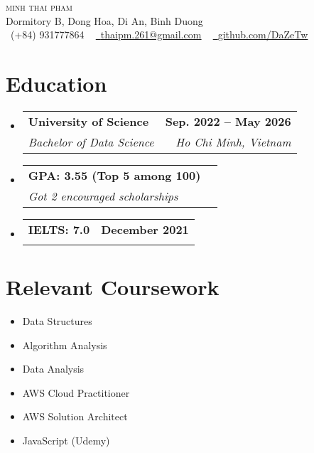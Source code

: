 \documentclass[letterpaper,11pt]{article}
\makeatletter
\newcommand{\resumeSubheading}[4]{
  \vspace{-2pt}\item
    \begin{tabular*}{1.0\textwidth}[t]{l@{\extracolsep{\fill}}r}
      \textbf{#1} & \textbf{\small #2} \\
      \textit{\small#3} & \textit{\small #4} \\
    \end{tabular*}\vspace{-7pt}
}
\newcommand{\resumeSubHeadingListStart}{\begin{itemize}[leftmargin=0.0in, label={}]}
\newcommand{\resumeSubHeadingListEnd}{\end{itemize}}
\makeatother
\begin{document}

\begin{center}
    {\Huge \scshape minh thai pham} \\ \vspace{1pt}
    Dormitory B, Dong Hoa, Di An, Binh Duong \\ \vspace{1pt}
    \small \raisebox{-0.1\height}\faPhone\ (+84) 931777864 ~ \href{mailto:thaipm.261@gmail.com}{\raisebox{-0.2\height}\faEnvelope\  \underline{thaipm.261@gmail.com}} ~ 
    \href{https://github.com/DaZeTw}{\raisebox{-0.2\height}\faGithub\ \underline{github.com/DaZeTw}}
    \vspace{-8pt}
\end{center}


\section{Education}
  \resumeSubHeadingListStart
    \resumeSubheading
      {University of Science}{Sep. 2022 -- May 2026}
      {Bachelor of Data Science}{Ho Chi Minh, Vietnam}
    \resumeSubheading
      {GPA: 3.55 (Top 5 among 100)}{}
      {Got 2 encouraged scholarships}{}
 \resumeSubheading
      {IELTS: 7.0}{December 2021}
      {}{}
      \vspace{-18pt}
  \resumeSubHeadingListEnd

\section{Relevant Coursework}
        \begin{multicols}{4}
            \begin{itemize}[itemsep=-5pt, parsep=3pt]
                \item\small Data Structures
                \item Algorithm Analysis
                \item Data Analysis
                \item AWS Cloud Practitioner 
                \item AWS Solution Architect 
                \item JavaScript (Udemy)
            \end{itemize}
        \end{multicols}
        \vspace*{2.0\multicolsep}
\end{document}
